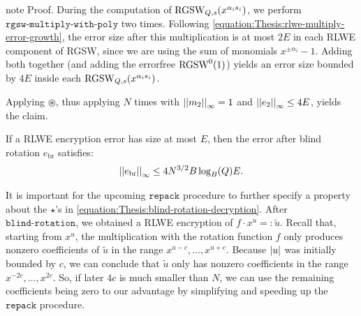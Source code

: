 \documentclass[letterpaper,10pt,english]{jupyterBook}
\begin{document}
\begin{sphinxadmonition}{note}
\sphinxAtStartPar
Proof. During the computation of \(\mathrm{RGSW}_{Q,s}(x^{\alpha_i s_i})\), we perform \(\texttt{rgsw-multiply-with-poly}\) two times.
Following \eqref{equation:Thesis:rlwe-multiply-error-growth}, the error size after this multiplication is at most \(2E\) in each RLWE component of RGSW, since we are using the sum of monomials \(x^{\pm \alpha_i} - 1\).
Adding both together (and adding the errorfree \(\mathrm{RGSW}^0(1)\)) yields an error size bounded by \(4E\) inside each \(\mathrm{RGSW}_{Q,s}(x^{\alpha_i s_i})\).

\sphinxAtStartPar
Applying \(\circledast\), thus applying {\hyperref[\detokenize{Thesis:error-after-star-multiplication}]{}} \(N\) times with \(\left\lvert\left\lvert m_2 \right\rvert\right\rvert_\infty = 1\) and \(\left\lvert\left\lvert e_2 \right\rvert\right\rvert_\infty \le 4E\), yields the claim.
\end{sphinxadmonition}

\sphinxAtStartPar
If a RLWE encryption error has size at most \(E\), then the error after blind rotation \(e_{\text{br}}\) satisfies:
\begin{equation*}
\begin{split}\left\lvert\left\lvert e_{\text{br}} \right\rvert\right\rvert_\infty \le 4N^{3/2}B \log_B(Q) E.\end{split}
\end{equation*}
\begin{DUlineblock}{0em}
\item[] 
\end{DUlineblock}

\sphinxAtStartPar
It is important for the upcoming \(\texttt{repack}\) procedure to further specify a property about the \(\star\)’s in \eqref{equation:Thesis:blind-rotation-decryption}.
After \(\texttt{blind-rotation}\), we obtained a RLWE encryption of \(f \cdot x^u =: \tilde u\).
Recall that, starting from \(x^u\), the multiplication with the rotation function \(f\) only produces non\sphinxhyphen{}zero coefficients of \(\tilde u\) in the range \(x^{u-c},\dots, x^{u+c}\).
Because \(\left\lvert u \right\rvert\) was initially bounded by \(c\), we can conclude that \(\tilde u\) only has non\sphinxhyphen{}zero coefficients in the range \(x^{-2c},\dots, x^{2c}\).
So, if later \(4c\) is much smaller than \(N\), we can use the remaining coefficients being zero to our advantage by simplifying and speeding up the \(\texttt{repack}\) procedure.

\label{\detokenize{Thesis:repacking}}
\begin{DUlineblock}{0em}
\item[] 
\end{DUlineblock}
\end{document}
